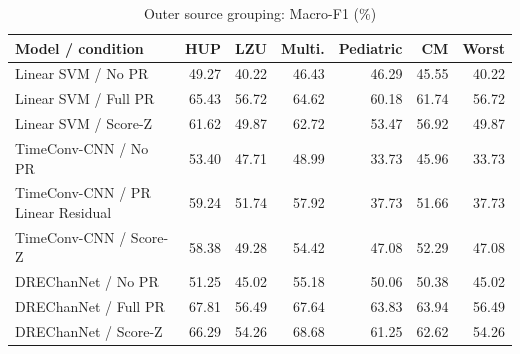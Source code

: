 \begin{table}[t]
\centering
\caption{Outer source grouping: Macro-F1 (\%)}
\small
\begin{tabular}{lrrrrrr}
\toprule
Model / condition & HUP & LZU & Multi. & Pediatric & CM & Worst \\
\midrule
Linear SVM / No PR & 49.27 & 40.22 & 46.43 & 46.29 & 45.55 & 40.22 \\
Linear SVM / Full PR & 65.43 & 56.72 & 64.62 & 60.18 & 61.74 & 56.72 \\
Linear SVM / Score-Z & 61.62 & 49.87 & 62.72 & 53.47 & 56.92 & 49.87 \\
TimeConv-CNN / No PR & 53.40 & 47.71 & 48.99 & 33.73 & 45.96 & 33.73 \\
TimeConv-CNN / PR Linear Residual & 59.24 & 51.74 & 57.92 & 37.73 & 51.66 & 37.73 \\
TimeConv-CNN / Score-Z & 58.38 & 49.28 & 54.42 & 47.08 & 52.29 & 47.08 \\
DREChanNet / No PR & 51.25 & 45.02 & 55.18 & 50.06 & 50.38 & 45.02 \\
DREChanNet / Full PR & 67.81 & 56.49 & 67.64 & 63.83 & 63.94 & 56.49 \\
DREChanNet / Score-Z & 66.29 & 54.26 & 68.68 & 61.25 & 62.62 & 54.26 \\
\bottomrule
\end{tabular}
\end{table}
